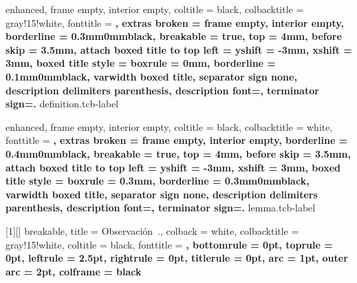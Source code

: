 {
    enhanced,
    frame empty,
    interior empty,
    coltitle = black,
    colbacktitle = gray!15!white,
    fonttitle = \bfseries,
    extras broken = {frame empty, interior empty},
    borderline = {0.3mm}{0mm}{black},
    breakable = true,
    top = 4mm,
    before skip = 3.5mm,
    attach boxed title to top left = {yshift = -3mm, xshift = 3mm},
    boxed title style = {boxrule = 0mm, borderline = {0.1mm}{0mm}{black}},
    varwidth boxed title,
    separator sign none, description delimiters parenthesis,
    description font=\bfseries,
    terminator sign={.\hspace{1mm}}
}
{definition.tcb-label}

{
    enhanced,
    frame empty,
    interior empty,
    coltitle = black,
    colbacktitle = white,
    fonttitle = \bfseries,
    extras broken = {frame empty, interior empty},
    borderline = {0.4mm}{0mm}{black},
    breakable = true,
    top = 4mm,
    before skip = 3.5mm,
    attach boxed title to top left = {yshift = -3mm, xshift = 3mm},
    boxed title style = {boxrule = 0.3mm, borderline = {0.3mm}{0mm}{black}},
    varwidth boxed title,
    separator sign none, description delimiters parenthesis,
    description font=\bfseries,
    terminator sign={.\hspace{1mm}}
}
{lemma.tcb-label}

[1][]
{
    breakable,
    title = Observación~\thetcbcounter.,
    colback = white,
    colbacktitle = gray!15!white,
    coltitle = black,
    fonttitle = \bfseries,
    bottomrule = 0pt,
    toprule = 0pt,
    leftrule = 2.5pt,
    rightrule = 0pt,
    titlerule = 0pt,
    arc = 1pt,
    outer arc = 2pt,
    colframe = black
}


\newenvironment{section-theorem.tcb}[1][]
{
    \ifstrempty{#1}
    {
        \begin{tcb-theorem-style}{}{}
    }
    {
        \begin{tcb-theorem-style}{#1}{}
    }
    }{
    \end{tcb-theorem-style}
}

\newenvironment{section-problem.tcb}
{
    \begin{tcb-problem-style}{}{}
    }{
    \end{tcb-problem-style}
}

\newenvironment{section-example.tcb}[1][]
{
    \ifstrempty{#1}
    {
        \begin{tcb-example-style}{}{}
    }
    {
        \begin{tcb-example-style}{#1}{}
    }
    }{
    \end{tcb-example-style}
}

